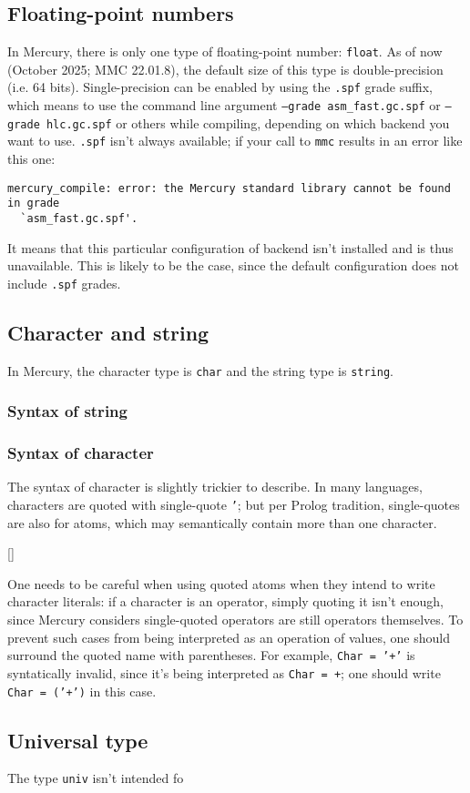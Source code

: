 \subsection{Floating-point numbers}

In Mercury, there is only one type of floating-point number: \texttt{float}. As of now (October 2025; MMC 22.01.8), the default size of this type is double-precision (i.e. 64 bits). Single-precision can be enabled by using the \texttt{.spf} grade suffix, which means to use the command line argument \texttt{--grade asm\_fast.gc.spf} or \texttt{--grade hlc.gc.spf} or others while compiling, depending on which backend you want to use. \texttt{.spf} isn't always available; if your call to \texttt{mmc} results in an error like this one:

\begin{lstlisting}
mercury_compile: error: the Mercury standard library cannot be found in grade
  `asm_fast.gc.spf'.
\end{lstlisting}

It means that this particular configuration of backend isn't installed and is thus unavailable. This is likely to be the case, since the default configuration does not include \texttt{.spf} grades.

\subsection{Character and string}

In Mercury, the character type is \texttt{char} and the string type is \texttt{string}.


\subsubsection{Syntax of string}



\subsubsection{Syntax of character}

The syntax of character is slightly trickier to describe. In many languages, characters are quoted with single-quote \texttt{'}; but per Prolog tradition, single-quotes are also for atoms, which may semantically contain more than one character.

[]

One needs to be careful when using quoted atoms when they intend to write character literals: if a character is an operator, simply quoting it isn't enough, since Mercury considers single-quoted operators are still operators themselves. To prevent such cases from being interpreted as an operation of values, one should surround the quoted name with parentheses. For example, \texttt{Char = '+'} is syntatically invalid, since it's being interpreted as \texttt{Char = +}; one should write \texttt{Char = ('+')} in this case.


\subsection{Universal type}

The type \texttt{univ} isn't intended fo



